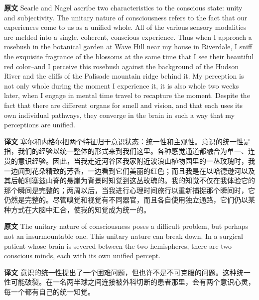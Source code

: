 \documentclass[UTF8,zihao=-4]{ctexart}
\newcommand{\BodyFont}{\fontsize{10.5pt}{15.5pt}\selectfont}
\newcommand{\origlabel}{\textbf{原文}\quad}
\newcommand{\translabel}{\textbf{译文}\quad}
\newenvironment{enblock}{\par\noindent\begingroup\BodyFont\origlabel}{\par\endgroup}
\newenvironment{zhblock}{\par\noindent\begingroup\BodyFont\translabel}{\par\endgroup\vspace{0.35em}}
\begin{document}
\begin{enblock}
Searle and Nagel ascribe two characteristics to the conscious state: unity and subjectivity. The unitary nature of consciousness refers to the fact that our experiences come to us as a unified whole. All of the various sensory modalities are melded into a single, coherent, conscious experience. Thus when I approach a rosebush in the botanical garden at Wave Hill near my house in Riverdale, I sniff the exquisite fragrance of the blossoms at the same time that I see their beautiful red color--and I perceive this rosebush against the background of the Hudson River and the cliffs of the Palisade mountain ridge behind it. My perception is not only whole during the moment I experience it, it is also whole two weeks later, when I engage in mental time travel to recapture the moment. Despite the fact that there are different organs for smell and vision, and that each uses its own individual pathways, they converge in the brain in such a way that my perceptions are unified.
\end{enblock}
\begin{zhblock}
塞尔和内格尔把两个特征归于意识状态：统一性和主观性。意识的统一性是指，我们的经验以统一整体的形式来到我们这里。各种感觉通道都融合为单一、连贯的意识经验。因此，当我走近河谷区我家附近波浪山植物园里的一丛玫瑰时，我一边闻到花朵精致的芳香，一边看到它们美丽的红色；而且我是在以哈德逊河以及其后帕利塞兹山脊的悬崖为背景时知觉到这丛玫瑰的。我的知觉不仅在我体验它的那个瞬间是完整的；两周以后，当我进行心理时间旅行以重新捕捉那个瞬间时，它仍然是完整的。尽管嗅觉和视觉有不同器官，而且各自使用独立通路，它们仍以某种方式在大脑中汇合，使我的知觉成为统一的。\end{zhblock}

\begin{enblock}
The unitary nature of consciousness poses a difficult problem, but perhaps not an insurmountable one. This unitary nature can break down. In a surgical patient whose brain is severed between the two hemispheres, there are two conscious minds, each with its own unified percept.
\end{enblock}
\begin{zhblock}
意识的统一性提出了一个困难问题，但也许不是不可克服的问题。这种统一性可能破裂。在一名两半球之间连接被外科切断的患者那里，会有两个意识心灵，每一个都有自己的统一知觉。\end{zhblock}
\end{document}
